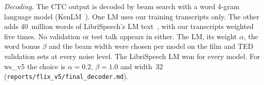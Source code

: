 \textit{Decoding.} The CTC output is decoded by beam search with a word 4-gram language model
(KenLM~\cite{heafield2011}). One LM uses our training transcripts only. The other adds 40~million
words of LibriSpeech's LM text~\cite{panayotov2015}, with our transcripts weighted five times. No
validation or test talk appears in either. The LM, its weight $\alpha$, the word bonus $\beta$ and
the beam width were chosen per model on the film and TED validation sets at every noise level.
The LibriSpeech LM won for every model. For ws\_v5 the choice is $\alpha = 0.2$, $\beta = 1.0$
and width~32 (\texttt{reports/flix\_v5/final\_decoder.md}).
